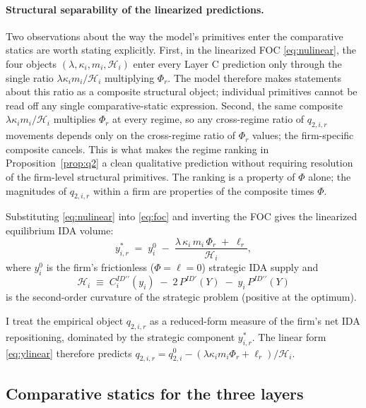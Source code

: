\documentclass[11pt]{article}
\begin{document}
\paragraph{Structural separability of the linearized predictions.} Two observations about the way the model's primitives enter the comparative statics are worth stating explicitly. First, in the linearized FOC \eqref{eq:nulinear}, the four objects $(\lambda, \kappa_{i}, m_{i}, \mathcal{H}_{i})$ enter every Layer C prediction only through the single ratio $\lambda\kappa_{i} m_{i}/\mathcal{H}_{i}$ multiplying $\Phi_{r}$. The model therefore makes statements about this ratio as a composite structural object; individual primitives cannot be read off any single comparative-static expression. Second, the same composite $\lambda\kappa_{i} m_{i}/\mathcal{H}_{i}$ multiplies $\Phi_{r}$ at every regime, so any cross-regime ratio of $q_{2,i,r}$ movements depends only on the cross-regime ratio of $\Phi_{r}$ values; the firm-specific composite cancels. This is what makes the regime ranking in Proposition~\ref{prop:q2} a clean qualitative prediction without requiring resolution of the firm-level structural primitives. The ranking is a property of $\Phi$ alone; the magnitudes of $q_{2,i,r}$ within a firm are properties of the composite times $\Phi$.

Substituting \eqref{eq:nulinear} into \eqref{eq:foc} and inverting the FOC gives the linearized equilibrium IDA volume:
\begin{equation}
y^{*}_{i,r} \;=\; y^{0}_{i} \;-\; \frac{\lambda\,\kappa_{i}\,m_{i}\,\Phi_{r} \;+\; \ell_{r}}{\mathcal{H}_{i}},
\label{eq:ylinear}
\end{equation}
where $y^{0}_{i}$ is the firm's frictionless ($\Phi = \ell = 0$) strategic IDA supply and
\begin{equation}
\mathcal{H}_{i} \;\equiv\; C^{ID\prime\prime}_{i}(y_{i}) \;-\; 2\,P^{ID\prime}(Y) \;-\; y_{i}\,P^{ID\prime\prime}(Y)
\end{equation}
is the second-order curvature of the strategic problem (positive at the optimum).

I treat the empirical object $q_{2,i,r}$ as a reduced-form measure of the firm's net IDA repositioning, dominated by the strategic component $y^{*}_{i,r}$. The linear form \eqref{eq:ylinear} therefore predicts $q_{2,i,r} = q^{0}_{2,i} - (\lambda\kappa_{i} m_{i}\Phi_{r} + \ell_{r})/\mathcal{H}_{i}$.

\subsection{Comparative statics for the three layers}
\label{sec:model-comparative}
\end{document}
